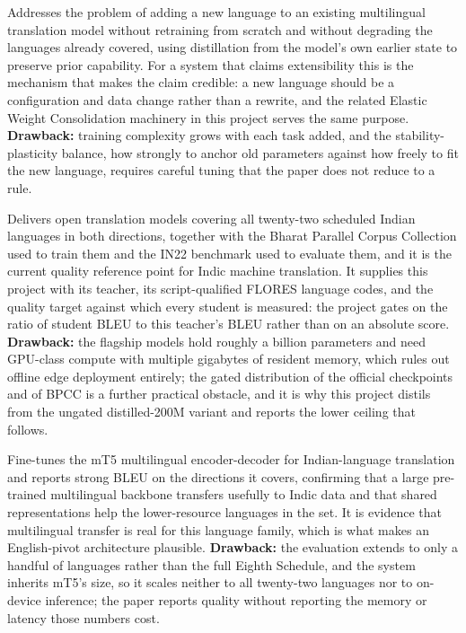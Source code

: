 Addresses the problem of adding a new language to an existing
multilingual translation model without retraining from scratch and without
degrading the languages already covered, using distillation from the model's
own earlier state to preserve prior capability. For a system that claims
extensibility this is the mechanism that makes the claim credible: a new
language should be a configuration and data change rather than a rewrite, and
the related Elastic Weight Consolidation machinery in this project serves the
same purpose. \textbf{Drawback:} training complexity grows with each task
added, and the stability-plasticity balance, how strongly to anchor old
parameters against how freely to fit the new language, requires careful tuning
that the paper does not reduce to a rule.

Delivers open translation models covering all twenty-two scheduled
Indian languages in both directions, together with the Bharat Parallel Corpus
Collection used to train them and the IN22 benchmark used to evaluate them, and
it is the current quality reference point for Indic machine translation. It
supplies this project with its teacher, its script-qualified FLORES language
codes, and the quality target against which every student is measured: the
project gates on the ratio of student BLEU to this teacher's BLEU rather than
on an absolute score. \textbf{Drawback:} the flagship models hold roughly a
billion parameters and need GPU-class compute with multiple gigabytes of
resident memory, which rules out offline edge deployment entirely; the gated
distribution of the official checkpoints and of BPCC is a further practical
obstacle, and it is why this project distils from the ungated distilled-200M
variant and reports the lower ceiling that follows.

Fine-tunes the mT5 multilingual encoder-decoder for Indian-language
translation and reports strong BLEU on the directions it covers, confirming
that a large pre-trained multilingual backbone transfers usefully to Indic data
and that shared representations help the lower-resource languages in the set.
It is evidence that multilingual transfer is real for this language family,
which is what makes an English-pivot architecture plausible.
\textbf{Drawback:} the evaluation extends to only a handful of languages rather
than the full Eighth Schedule, and the system inherits mT5's size, so it scales
neither to all twenty-two languages nor to on-device inference; the paper
reports quality without reporting the memory or latency those numbers cost.

